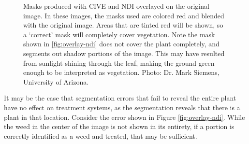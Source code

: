 \documentclass[letterpaper, notitlepage]{report}
\begin{document}
{\begin{figure}[H]
	\centering
	\hfill
	\caption[Masks overlayed on original images]{Masks produced with CIVE and NDI overlayed on the original image. In these images, the masks used are colored red and blended with the original image. Areas that are tinted red will be shown, so a `correct' mask will completely cover vegetation. Note the mask shown in \ref{fig:overlay-ndi} does not cover the plant completely, and segments out shadow portions of the image. This may have resulted from sunlight shining through the leaf, making the ground green enough to be interpreted as vegetation. Photo: Dr. Mark Siemens, University of Arizona.}
	\label{fig:overlay}
\end{figure}

It may be the case that segmentation errors that fail to reveal the entire plant have no effect on treatment systems, as the segmentation reveals that there is a plant in that location.  Consider the error shown in Figure \ref{fig:overlay-ndi}. While the weed in the center of the image is not shown in its entirety, if a portion is correctly identified as a weed and treated, that may be sufficient. 

}
\end{document}
